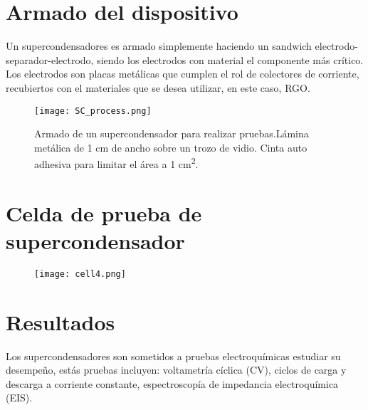 
\section{Armado del dispositivo}
Un supercondensadores es armado simplemente haciendo un sandwich electrodo-separador-electrodo, siendo los electrodos con material el componente más crítico. Los electrodos son placas metálicas que cumplen el rol de colectores de corriente, recubiertos con el materiales que se desea utilizar, en este caso, RGO.

\begin{figure}[h!]
	\centering
	\texttt{[image: SC\_process.png]}
	\label{fig:SC_process}
	\caption[Armado de un supercondensador para realizar pruebas de concepto.]{Armado de un supercondensador para realizar pruebas.\protect{}Lámina metálica de 1 cm de ancho sobre un trozo de vidio. \protect{} Cinta auto adhesiva para limitar el área a 1 cm\protect\textsuperscript{2}.}
\end{figure}
\section{Celda de prueba de supercondensador}

\begin{figure}[h!]
	\centering
	\texttt{[image: cell4.png]}
	\label{fig:celda_de_pruebas_SC}
\end{figure}


\section{Resultados}
Los supercondensadores son sometidos a pruebas electroquímicas estudiar su desempeño, estás pruebas incluyen: voltametría cíclica (CV), ciclos de carga y descarga a corriente constante, espectroscopía de impedancia electroquímica (EIS).
